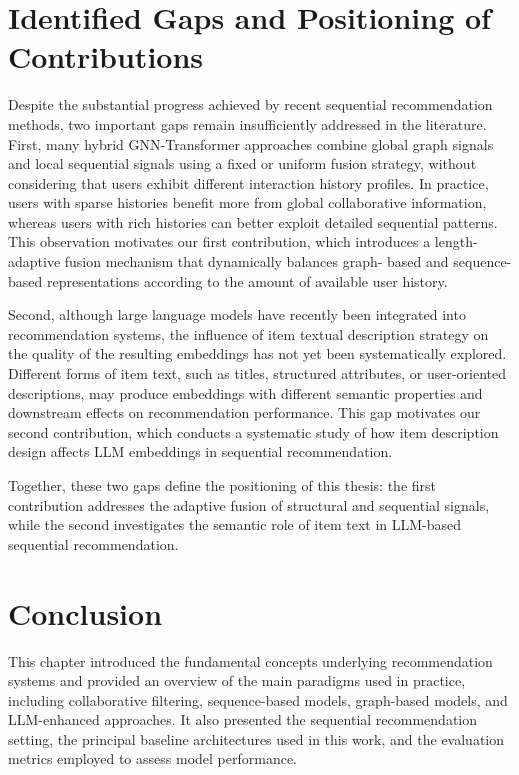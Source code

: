 \documentclass[12pt,a4paper]{report}
\begin{document}
\section{Identified Gaps and Positioning of Contributions}

\justifying
Despite the substantial progress achieved by recent sequential recommendation
methods, two important gaps remain insufficiently addressed in the literature.
First, many hybrid GNN-Transformer approaches combine global graph signals and
local sequential signals using a fixed or uniform fusion strategy, without
considering that users exhibit different interaction history profiles. In
practice, users with sparse histories benefit more from global collaborative
information, whereas users with rich histories can better exploit detailed
sequential patterns. This observation motivates our first contribution, which
introduces a length-adaptive fusion mechanism that dynamically balances graph-
based and sequence-based representations according to the amount of available
user history.

Second, although large language models have recently been integrated into
recommendation systems, the influence of item textual description strategy on
the quality of the resulting embeddings has not yet been systematically
explored. Different forms of item text, such as titles, structured attributes,
or user-oriented descriptions, may produce embeddings with different semantic
properties and downstream effects on recommendation performance. This gap
motivates our second contribution, which conducts a systematic study of how item
description design affects LLM embeddings in sequential recommendation.

Together, these two gaps define the positioning of this thesis: the first
contribution addresses the adaptive fusion of structural and sequential signals,
while the second investigates the semantic role of item text in LLM-based
sequential recommendation.

\section{Conclusion}

\justifying
This chapter introduced the fundamental concepts underlying recommendation
systems and provided an overview of the main paradigms used in practice,
including collaborative filtering, sequence-based models, graph-based models,
and LLM-enhanced approaches. It also presented the sequential recommendation
setting, the principal baseline architectures used in this work, and the
evaluation metrics employed to assess model performance.
\end{document}
